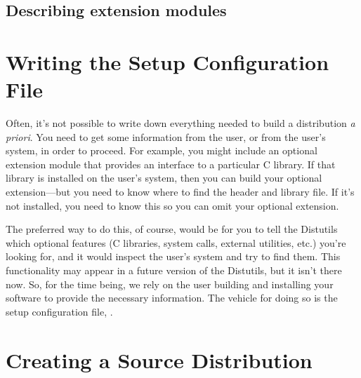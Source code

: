 \documentclass{howto}
\begin{document}
\subsection{Describing extension modules}
\label{sec:describing-extensions}



\section{Writing the Setup Configuration File}
\label{setup-config}


Often, it's not possible to write down everything needed to build a
distribution \emph{a priori}.  You need to get some information from the
user, or from the user's system, in order to proceed.  For example, you
might include an optional extension module that provides an interface to
a particular C library.  If that library is installed on the user's
system, then you can build your optional extension---but you need to
know where to find the header and library file.  If it's not installed,
you need to know this so you can omit your optional extension.

The preferred way to do this, of course, would be for you to tell the
Distutils which optional features (C libraries, system calls, external
utilities, etc.) you're looking for, and it would inspect the user's
system and try to find them.  This functionality may appear in a future
version of the Distutils, but it isn't there now.  So, for the time
being, we rely on the user building and installing your software to
provide the necessary information.  The vehicle for doing so is the
setup configuration file, .



\section{Creating a Source Distribution}
\label{source-dist}
\end{document}
